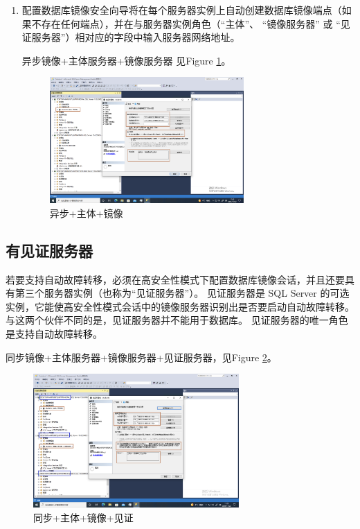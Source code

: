 \documentclass[onecolumn,oneside]{BUPTHomework}
\begin{document}
\begin{enumerate}
    \item 配置数据库镜像安全向导将在每个服务器实例上自动创建数据库镜像端点（如果不存在任何端点），并在与服务器实例角色（“主体”、 “镜像服务器” 或 “见证服务器”）相对应的字段中输入服务器网络地址。

    异步镜像+主体服务器+镜像服务器 见Figure \ref{pic11}。

    \begin{figure}[h]
      \centering
      \includegraphics[width=0.70\textwidth]{image/pic11.png}
      \caption{异步+主体+镜像}
      \label{pic11}
    \end{figure}

  \end{enumerate}

  \subsection{有见证服务器}

  若要支持自动故障转移，必须在高安全性模式下配置数据库镜像会话，并且还要具有第三个服务器实例（也称为“见证服务器”）。
  见证服务器是 SQL Server 的可选实例，它能使高安全性模式会话中的镜像服务器识别出是否要启动自动故障转移。
  与这两个伙伴不同的是，见证服务器并不能用于数据库。 见证服务器的唯一角色是支持自动故障转移。

  同步镜像+主体服务器+镜像服务器+见证服务器，见Figure \ref{pic12}。

  \newpage

  \begin{figure}[h]
    \centering
    \includegraphics[width=0.70\textwidth]{image/pic12.png}
    \caption{同步+主体+镜像+见证}
    \label{pic12}
  \end{figure}
\end{document}
